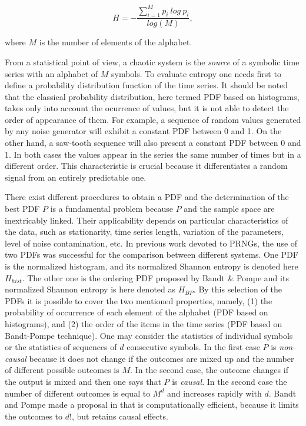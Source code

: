 \begin{equation}
H=-\frac{\sum_{i=1}^{M}{p_i~log~p_i}}{log(M)}, \label{eq:shannon}
\end{equation}

where $M$ is the number of elements of the alphabet.

From a statistical point of view, a chaotic system is the \textsl{source} of a symbolic time series with an alphabet of $M$ symbols. To evaluate entropy one needs first to define a probability distribution function of the time series. It should be noted that the classical probability distribution, here termed PDF based on histograms, takes only into account the ocurrence of values, but it is not able to detect the order of appearance of them. For example, a sequence of random values generated by any noise generator will exhibit a constant PDF between 0 and 1. On the other hand, a saw-tooth sequence will also present a constant PDF between 0 and 1. In both cases the values appear in the series the same number of times but in a different order. This characteristic is crucial because it differentiates a random signal from an entirely predictable one.

There exist different procedures to obtain a PDF \cite{Rosso2009,DeMicco2008,Mischaikow1999,Powell1979,Rosso2001,Pompe2002} and the determination of the best PDF $P$ is a fundamental problem because $P$ and the sample space are inextricably linked. Their applicability depends on particular characteristics of the data, such as stationarity, time series length, variation of the parameters, level of noise contamination, etc. In previous work devoted to PRNGs, the use of two
PDFs was successful for the comparison between different systems. One PDF is the
normalized histogram, and its normalized Shannon
entropy is denoted here $H_{hist}$. The other one is the ordering PDF
proposed by Bandt \& Pompe \cite{Pompe2002} and its  normalized Shannon entropy is  here denoted as $H_{BP}$. By this selection of the PDFs it is possible to cover the two mentioned properties, namely, (1) the probability of occurrence of each element of the alphabet (PDF based on histograms), and (2) the order of the items in the time series (PDF based on Bandt-Pompe technique).
One may consider the statistics of individual symbols or the statistics of sequences of $d$ consecutive symbols. In the first case $P$ is \textsl{non-causal} because it does not change if the outcomes are mixed up and the number of different possible outcomes is $M$. In the second case, the outcome changes if the output is mixed and then one says that $P$ is \textsl{causal}. In the second case the number of different outcomes is equal to $M^d$ and increases rapidly with $d$. Bandt and Pompe made a proposal in \cite{Pompe2002} that is computationally efficient, because it limits the outcomes to $d!$, but retains causal effects.

